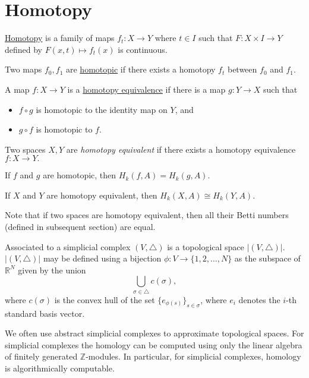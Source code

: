 \section{Homotopy} \label{sec:homotopy}

\begin{defn}[Homotopy]

	\underline{Homotopy} is a family of maps $f_t: X \to Y$ where $t \in I$ such that $F: X\times I \to Y$ defined by $F(x,t) \mapsto f_t(x)$ is continuous.
	
	Two maps $f_0, f_1$ are \underline{homotopic} if there exists a homotopy $f_t$ between $f_0$ and $f_1$.  
\end{defn}

\begin{defn}
A map $f:X \to Y$ is a \underline{homotopy equivalence} if there is a map $g: Y \to X$ such that 
\begin{itemize}
	\item $f\circ g$ is homotopic to the identity map on $Y$, and
	\item $g\circ f$ is homotopic to $f$.
\end{itemize}

Two spaces $X,Y$ are\textit{ homotopy equivalent} if there exists a homotopy equivalence $f: X \to Y. $
\end{defn}

\begin{thm}
	If $f$ and $g$ are homotopic, then $H_k(f,A) = H_k(g,A).$ 
	
	If $X$ and $Y$ are homotopy equivalent, then $H_k(X,A) \cong H_k(Y,A) $.
	
	Note that if two spaces are homotopy equivalent, then all their Betti numbers (defined in subsequent section) are equal.
\end{thm}
\begin{defn}
    Associated to a simplicial complex $(V, \triangle)$ is a topological space $|(V,\triangle)|$. $|(V,\triangle)|$ may be defined using a bijection $\phi : V \to \{1, 2, \dots,N\}$ as the subspace of $\mathbb{R}^N$ given by the union 
	$$\bigcup_{\sigma \in \triangle} c(\sigma),$$
	where $c(\sigma)$ is the convex hull of the set $\{e_{\phi(s)}\}_{s\in \sigma}$, where $e_i$ denotes the $i$-th standard basis vector.

	 We often use abstract simplicial complexes to approximate topological spaces. For simplicial complexes the homology can be computed using only the linear algebra of finitely generated $\mathbb{Z}$-modules. In particular, for simplicial complexes, homology is algorithmically computable.
\end{defn}	
	

